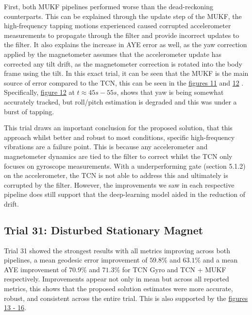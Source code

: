 First, both MUKF pipelines performed worse than the dead-reckoning counterparts. This can be explained through the update step of the MUKF, the high-frequency tapping motions experienced caused corrupted
accelerometer measurements to propagate through the filter and provide incorrect updates to the filter. It also explains the increase in AYE error as well, as the yaw correction applied by the magnetometer 
assumes that the accelerometer update has corrected any tilt drift, as the magnetometer correction is rotated into the body frame using the tilt. 
In this exact trial, it can be seen that the MUKF is the main source of error compared to the TCN, this can be seen in the \hyperref[fig:tap_gyro_euler]{figures 11} and \hyperref[fig:tap_mukf_euler]{12} . 
Specifically,
\hyperref[fig:tap_mukf_euler]{figure 12} at $t \approx 45s-55s$, shows that yaw is being somewhat accurately tracked, but roll/pitch estimation is degraded and this was under a burst of tapping.

This trial draws an important conclusion for the proposed solution, that this approach whilst better and robust to most conditions, specific high-frequency vibrations are a failure point. This is because
any accelerometer and magnetometer dynamics are tied to the filter to correct whilst the TCN only focuses on gyroscope measurements. With a underperforming gate (section 5.1.2) 
on the accelerometer, the TCN is not able to 
address this and ultimately is corrupted by the filter. However, the improvements we saw in each respective pipeline does still support that the deep-learning model aided in the reduction of drift.



\subsection{Trial 31: Disturbed Stationary Magnet}
Trial 31 showed the strongest results with all metrics improving across both pipelines, a mean geodesic error improvement of $59.8\%$ and $63.1\%$ and a mean AYE improvement of $70.9\%$ and $71.3\%$ for TCN Gyro 
and TCN + MUKF 
respectively. Improvements appear not only in mean but across all reported metrics, this shows that the proposed solution estimates were more accurate, robust, and consistent across the entire trial. 
This is also supported by the \hyperref[fig:static_mag_gyro_geo]{figures 13 - 16}. 

